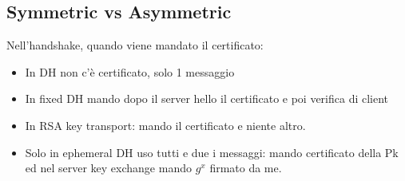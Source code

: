 \documentclass[16px]{article}
\begin{document}
\subsection{Symmetric vs Asymmetric}
Nell'handshake, quando viene mandato il certificato:
\begin{itemize}
\item In DH non c'è certificato, solo 1 messaggio
\item In fixed DH mando dopo il server hello il certificato e poi verifica di client
\item In RSA key transport: mando il certificato e niente altro.
\item Solo in ephemeral DH uso tutti e due i messaggi: mando certificato della Pk ed nel server key exchange mando $g^x$ firmato da me.
\end{itemize}
\end{document}
